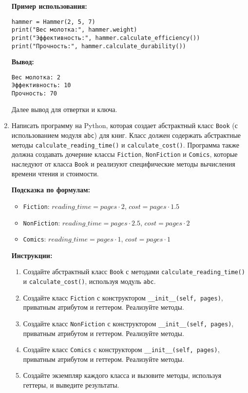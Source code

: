 \begin{enumerate}
\textbf{Пример использования:}
\begin{verbatim}
hammer = Hammer(2, 5, 7)
print("Вес молотка:", hammer.weight)
print("Эффективность:", hammer.calculate_efficiency())
print("Прочность:", hammer.calculate_durability())
\end{verbatim}

\textbf{Вывод:}
\begin{verbatim}
Вес молотка: 2
Эффективность: 10
Прочность: 70
\end{verbatim}

Далее вывод для отвертки и ключа.

\item
Написать программу на Python, которая создает абстрактный класс \texttt{Book} (с использованием модуля \texttt{abc}) для книг. 
Класс должен содержать абстрактные методы \texttt{calculate\_reading\_time()} и \texttt{calculate\_cost()}. 
Программа также должна создавать дочерние классы \texttt{Fiction}, \texttt{NonFiction} и \texttt{Comics}, 
которые наследуют от класса \texttt{Book} и реализуют специфические методы вычисления времени чтения и стоимости.

\textbf{Подсказка по формулам:}
\begin{itemize}
    \item \texttt{Fiction}: $reading\_time = pages \cdot 2$, $cost = pages \cdot 1.5$
    \item \texttt{NonFiction}: $reading\_time = pages \cdot 2.5$, $cost = pages \cdot 2$
    \item \texttt{Comics}: $reading\_time = pages \cdot 1$, $cost = pages \cdot 1$
\end{itemize}

\textbf{Инструкции:}
\begin{enumerate}
    \item Создайте абстрактный класс \texttt{Book} с методами \texttt{calculate\_reading\_time()} и \texttt{calculate\_cost()}, используя модуль \texttt{abc}.
    \item Создайте класс \texttt{Fiction} с конструктором \texttt{\_\_init\_\_(self, pages)}, приватным атрибутом и геттером. Реализуйте методы.
    \item Создайте класс \texttt{NonFiction} с конструктором \texttt{\_\_init\_\_(self, pages)}, приватным атрибутом и геттером. Реализуйте методы.
    \item Создайте класс \texttt{Comics} с конструктором \texttt{\_\_init\_\_(self, pages)}, приватным атрибутом и геттером. Реализуйте методы.
    \item Создайте экземпляр каждого класса и вызовите методы, используя геттеры, и выведите результаты.
\end{enumerate}


\end{enumerate}
